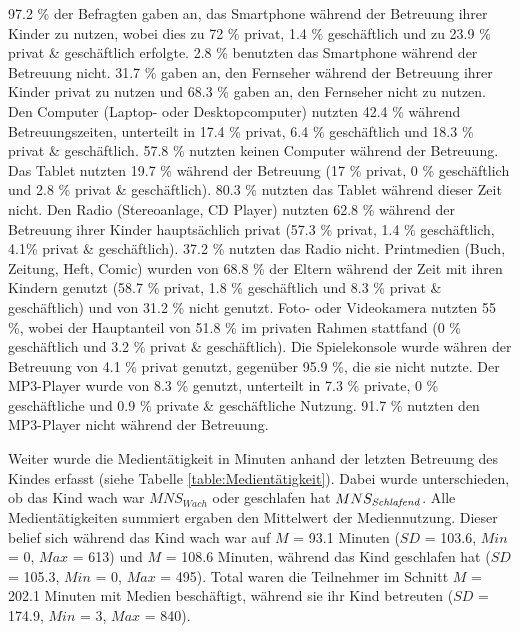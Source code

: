 97.2 \% der Befragten gaben an, das Smartphone während der Betreuung ihrer Kinder zu nutzen, wobei dies zu 72 \% privat, 1.4 \% geschäftlich und zu 23.9 \% privat \& geschäftlich erfolgte. 2.8 \% benutzten das Smartphone während der Betreuung nicht. 31.7 \% gaben an, den Fernseher während der Betreuung ihrer Kinder privat zu nutzen und 68.3 \% gaben an, den Fernseher nicht zu nutzen. Den Computer (Laptop- oder Desktopcomputer) nutzten 42.4 \% während Betreuungszeiten, unterteilt in 17.4 \% privat, 6.4 \% geschäftlich und 18.3 \% privat \& geschäftlich. 57.8 \% nutzten keinen Computer während der Betreuung. Das Tablet nutzten 19.7 \% während der Betreuung (17 \% privat, 0 \% geschäftlich und 2.8 \% privat \& geschäftlich). 80.3 \% nutzten das Tablet während dieser Zeit nicht. Den Radio (Stereoanlage, CD Player) nutzten 62.8 \% während der Betreuung ihrer Kinder hauptsächlich privat (57.3 \% privat, 1.4 \% geschäftlich, 4.1\% privat \& geschäftlich). 37.2 \% nutzten das Radio nicht. Printmedien (Buch, Zeitung, Heft, Comic) wurden von 68.8 \% der Eltern während der Zeit mit ihren Kindern genutzt (58.7 \% privat, 1.8 \% geschäftlich und 8.3 \% privat \& geschäftlich) und von 31.2 \% nicht genutzt. Foto- oder Videokamera nutzten 55 \%, wobei der Hauptanteil von 51.8 \% im privaten Rahmen stattfand (0 \% geschäftlich und 3.2 \% privat \& geschäftlich). Die Spielekonsole wurde währen der Betreuung von 4.1 \% privat genutzt, gegenüber 95.9 \%, die sie nicht nutzte. Der MP3-Player wurde von 8.3 \% genutzt, unterteilt in 7.3 \% private, 0 \% geschäftliche und 0.9 \% private \& geschäftliche Nutzung. 91.7 \% nutzten den MP3-Player nicht während der Betreuung.

Weiter wurde die Medientätigkeit in Minuten anhand der letzten Betreuung des Kindes erfasst (siehe Tabelle \ref{table:Medientätigkeit}). Dabei wurde unterschieden, ob das Kind wach war $MNS_{Wach}$ oder geschlafen hat $MNS_{\text{\textit{Schlafend}}}$. Alle Medientätigkeiten summiert ergaben den Mittelwert der Mediennutzung. Dieser belief sich während das Kind wach war auf $M$ = 93.1 Minuten ($SD$ = 103.6, $Min$ = 0, $Max$ = 613) und $M$ = 108.6 Minuten, während das Kind geschlafen hat ($SD$ = 105.3, $Min$ = 0, $Max$ = 495). Total waren die Teilnehmer im Schnitt $M$ = 202.1 Minuten mit Medien beschäftigt, während sie ihr Kind betreuten ($SD$ = 174.9, $Min$ = 3, $Max$ = 840).

